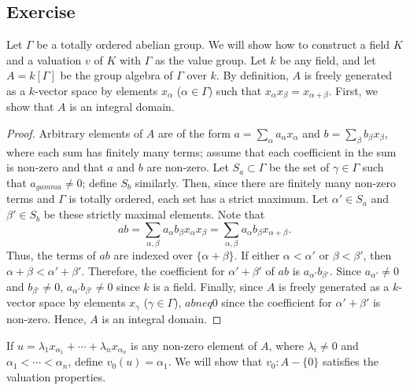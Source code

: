 \subsection{Exercise}\label{5.33}

Let $\Gamma$ be a totally ordered abelian group. We will show how to construct a field $K$ and a valuation $v$ of $K$ with $\Gamma$ as the value group.
Let $k$ be any field, and let $A = k[\Gamma]$ be the group algebra of $\Gamma$ over $k$. By definition, $A$ is freely generated as a $k$-vector space by
elements $x_{\alpha}$ ($\alpha \in \Gamma$) such that $x_{\alpha}x_{\beta} = x_{\alpha+\beta}$. First, we show that $A$ is an integral domain.

\begin{proof}
Arbitrary elements of $A$ are of the form $a = \sum_{\alpha} a_{\alpha} x_{\alpha}$ and $b = \sum_{\beta} b_{\beta} x_{\beta}$, where 
each sum has finitely many terms; assume that each coefficient in the sum is non-zero and that $a$ and $b$ are non-zero. Let $S_a \subset \Gamma$ be the set 
of $\gamma \in \Gamma$ such that $a_{gamma} \neq 0$; define $S_b$ similarly. Then, since there are finitely many non-zero terms and $\Gamma$ is totally ordered,
each set has a strict maximum. Let $\alpha' \in S_a$ and $\beta' \in S_b$ be these strictly maximal elements. Note that
$$ab = \sum_{\alpha,\beta} a_{\alpha} b_{\beta} x_{\alpha}x_{\beta} = \sum_{\alpha,\beta} a_{\alpha} b_{\beta} x_{\alpha + \beta}.$$
Thus, the terms of $ab$ are indexed over $\{\alpha + \beta\}$. If either $\alpha < \alpha'$ or $\beta < \beta'$, then $\alpha + \beta < \alpha' + \beta'$.
Therefore, the coefficient for $\alpha' + \beta'$ of $ab$ is $a_{\alpha'} b_{\beta'}$. Since $a_{\alpha'} \neq 0$ and $b_{\beta'} \neq 0$, 
$a_{\alpha'} b_{\beta'} \neq 0$ since $k$ is a field. Finally, since $A$ is freely generated as a $k$-vector space by elements $x_{\gamma}$ 
($\gamma \in \Gamma$), $ab neq 0$ since the coefficient for $\alpha' + \beta'$ is non-zero. Hence, $A$ is an integral domain.
\end{proof}

If $u = \lambda_1 x_{\alpha_1} + \cdots + \lambda_n x_{\alpha_n}$ is any non-zero element of $A$, where $\lambda_i \neq 0$ and $\alpha_1 < \cdots < \alpha_n$,
define $v_0(u) = \alpha_1$. We will show that $v_0 : A - \{0\}$ satisfies the valuation properties.

